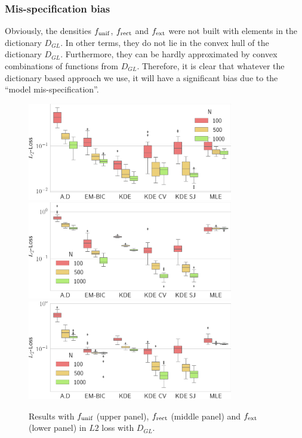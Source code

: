 \subsubsection{Mis-specification bias}

Obviously, the densities $f_{\textnormal{unif}}$, $f_{\textnormal{rect}}$ and $f_{\textnormal{ext}}$ 
were not built with elements in the dictionary $D_{GL}$. In other terms, they do not lie in the convex hull
of the dictionary $D_{GL}$. Furthermore, they can be hardly approximated by convex combinations of functions
from $D_{GL}$. Therefore, it is clear that whatever the dictionary based approach we use, it will have a 
significant bias due to the ``model mis-specification''. 


\begin{figure}
\center
    \includegraphics[width=0.8\textwidth]{./TeX_files/res_uniform_L2_GL.png}
    \includegraphics[width=0.8\textwidth]{./TeX_files/res_rect_L2_GL.png}
    \includegraphics[width=0.8\textwidth]{./TeX_files/res_lapl_gauss_not_dict_L2_GL.png}
    \caption{Results with $f_{\textnormal{unif}}$ (upper panel), $f_{\textnormal{rect}}$ 
    (middle panel) and $f_{\textnormal{ext}}$ (lower panel) in $L2$ loss with $D_{GL}$.}
    \label{fig:res_ext_L2_GL}
\end{figure}

